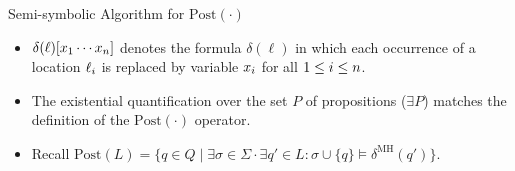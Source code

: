 \documentclass[12pt]{beamer}
\begin{document}
\begin{frame}{Semi-symbolic Algorithm for $\text{Post}(\cdot)$}
	\begin{itemize}
	
		\item $\delta(\ell)[\mathnormal{x}_{1} \cdots \mathnormal{x}_\mathnormal{n}]$ denotes the formula
		$\delta(\ell)$ in which each occurrence of a location $\ell_{\mathnormal{i}}$ is replaced by variable $\mathnormal{x}_{\mathnormal{i}}$ for all $1 \leq \mathnormal{i} \leq \mathnormal{n}$.
		\item The existential quantification over the set $P$ of propositions ($\exists P$) matches
		the definition of the $\text{Post}(\cdot)$ operator.
		\item Recall $\text{Post}(L) = \{q \in Q \mid \exists \sigma \in \Sigma \cdot \exists q' \in L : \sigma \cup \{q\} \models \delta^{\text{MH}}(q')\}$.
	\end{itemize}
\end{frame}
\end{document}

